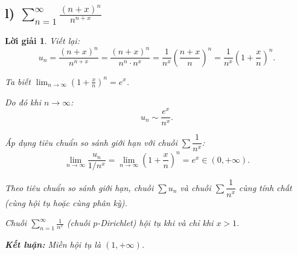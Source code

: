 \documentclass[12pt,a4paper]{article}
\newtheorem*{solution}{Lời giải}
\begin{document}
\subsection*{l) $\displaystyle\sum_{n=1}^{\infty}\frac{(n+x)^{n}}{n^{n+x}}$}

\begin{solution}
Viết lại:
\[
u_n = \frac{(n+x)^n}{n^{n+x}} = \frac{(n+x)^n}{n^n \cdot n^x} = \frac{1}{n^x}\left(\frac{n+x}{n}\right)^n = \frac{1}{n^x}\left(1+\frac{x}{n}\right)^n.
\]

Ta biết $\displaystyle\lim_{n\to\infty}\left(1+\frac{x}{n}\right)^n = e^x$.

Do đó khi $n \to \infty$:
\[
u_n \sim \frac{e^x}{n^x}.
\]

Áp dụng tiêu chuẩn so sánh giới hạn với chuỗi $\sum \dfrac{1}{n^x}$:
\[
\lim_{n\to\infty}\frac{u_n}{1/n^x} = \lim_{n\to\infty}\left(1+\frac{x}{n}\right)^n = e^x \in (0, +\infty).
\]

Theo tiêu chuẩn so sánh giới hạn, chuỗi $\sum u_n$ và chuỗi $\sum \dfrac{1}{n^x}$ cùng tính chất (cùng hội tụ hoặc cùng phân kỳ).

Chuỗi $\displaystyle\sum_{n=1}^{\infty}\frac{1}{n^x}$ (chuỗi $p$-Dirichlet) hội tụ khi và chỉ khi $x > 1$.

\textbf{Kết luận:} Miền hội tụ là $\boxed{(1, +\infty)}$.
\end{solution}
\end{document}
